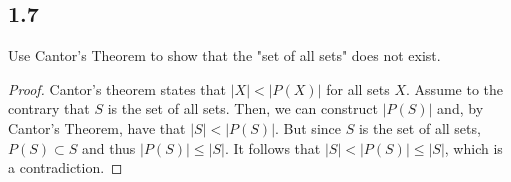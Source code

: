 \subsection*{1.7} Use Cantor's Theorem to show that the "set of all sets" does not exist.

\begin{proof}
Cantor's theorem states that $|X| < |P(X)|$ for all sets $X$. Assume to the contrary that $S$ is the set of all sets. Then, we can construct $|P(S)|$ and, by Cantor's Theorem, have that $|S| < |P(S)|$. But since $S$ is the set of all sets, $P(S) \subset S$ and thus $|P(S)| \leq |S|$. It follows that $|S| < |P(S)| \leq |S|$, which is a contradiction.
\end{proof}

